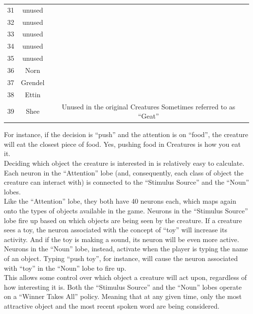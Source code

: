 \documentclass[11pt,twoside,a4paper]{article}
\begin{document}
{\begin{minipage}[ht]{0.75\textwidth}
\begin{tabular}[c]{|c|c|c|}
	31	&	unused							&								\\
	32	&	unused							&								\\
	33	&	unused							&								\\
	34	&	unused							&								\\
	35	&	unused							&								\\
	36	&	Norn							&								\\
	37	&	Grendel							&								\\
	38	&	Ettin							&								\\
	39	&	Shee				&	Unused in the original Creatures Sometimes referred to as “Geat”	\\
	\end{tabular}%
\end{minipage}
} %

For instance, if the decision is “push” and the attention is on “food”, the creature will eat the closest piece of food. Yes, pushing food in Creatures is how you eat it.~\\

Deciding which object the creature is interested in is relatively easy to calculate. Each neuron in the “Attention” lobe (and, consequently, each class of object the creature can interact with) is connected to the “Stimulus Source” and the “Noun” lobes.~\\

Like the “Attention” lobe, they both have 40 neurons each, which maps again onto the types of objects available in the game. Neurons in the “Stimulus Source” lobe fire up based on which objects are being seen by the creature. If a creature sees a toy, the neuron associated with the concept of “toy” will increase its activity. And if the toy is making a sound, its neuron will be even more active.~\\

Neurons in the “Noun” lobe, instead, activate when the player is typing the name of an object. Typing “push toy”, for instance, will cause the neuron associated with “toy” in the “Noun” lobe to fire up.~\\

This allows some control over which object a creature will act upon, regardless of how interesting it is. Both the “Stimulus Source” and the “Noun” lobes operate on a “Winner Takes All” policy. Meaning that at any given time, only the most attractive object and the most recent spoken word are being considered.~\\
\end{document}
